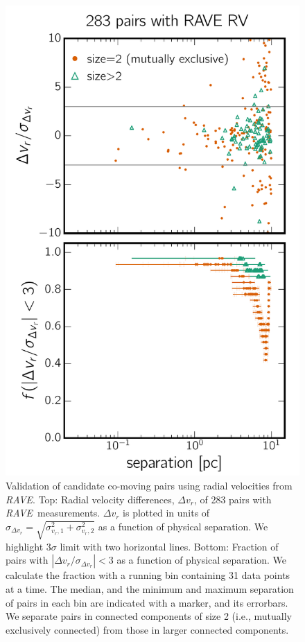 \documentclass[manuscript, letterpaper]{aastex6}
\newcommand{\project}[1]{\textsl{#1}}
\newcommand{\acronym}[1]{{\small{#1}}}
\newcommand{\rave}{\project{\acronym{RAVE}}}
\begin{document}
\begin{figure}[htbp]
  \begin{center}
    \includegraphics[width=0.6\linewidth]{figures/raverv.pdf}
  \end{center}
  \caption{%
    Validation of candidate co-moving pairs using radial velocities from \rave.
    Top: Radial velocity differences, $\Delta v_r$, of 283 pairs with \rave\ measurements.
    $\Delta v_r$ is plotted in units of $\sigma_{\Delta v_r} = \sqrt{\sigma_{v_r,1}^2 + \sigma_{v_r,2}^2}$
    as a function of physical separation.
    We highlight $3\sigma$ limit with two horizontal lines.
    Bottom: Fraction of pairs with $|\Delta v_r/\sigma_{\Delta v_r}| <3$
    as a function of physical separation. We calculate the fraction with a running
    bin containing 31 data points at a time.
    The median, and the minimum and maximum separation of pairs in each bin are
    indicated with a marker, and its errorbars.
    We separate pairs in connected components of size 2 (i.e., mutually exclusively connected)
    from those in larger connected components.
    \label{fig:raverv}}
\end{figure}
\end{document}
